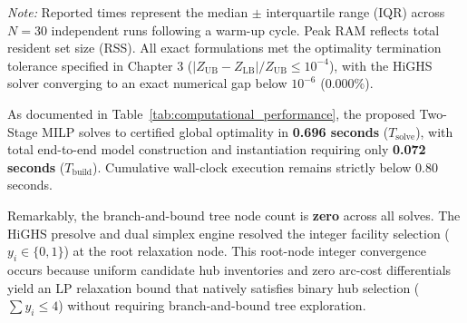 \begin{table}[htbp]
\centering
\caption{Computational Execution and Algorithmic Complexity Metrics across Formulations ($N = 30$ Runs)}
\label{tab:computational_performance}
\vspace{1ex}
\parbox{\textwidth}{\footnotesize \textit{Note:} Reported times represent the median $\pm$ interquartile range (IQR) across $N = 30$ independent runs following a warm-up cycle. Peak RAM reflects total resident set size (RSS). All exact formulations met the optimality termination tolerance specified in Chapter 3 ($|Z_{\text{UB}} - Z_{\text{LB}}| / Z_{\text{UB}} \le 10^{-4}$), with the HiGHS solver converging to an exact numerical gap below $10^{-6}$ ($0.000\%$).}
\end{table}

As documented in Table~\ref{tab:computational_performance}, the proposed Two-Stage MILP solves to certified global optimality in \textbf{0.696 seconds} ($T_{\text{solve}}$), with total end-to-end model construction and instantiation requiring only \textbf{0.072 seconds} ($T_{\text{build}}$). Cumulative wall-clock execution remains strictly below 0.80 seconds.

Remarkably, the branch-and-bound tree node count is \textbf{zero} across all solves. The HiGHS presolve and dual simplex engine resolved the integer facility selection ($y_i \in \{0, 1\}$) at the root relaxation node. This root-node integer convergence occurs because uniform candidate hub inventories and zero arc-cost differentials yield an LP relaxation bound that natively satisfies binary hub selection ($\sum y_i \le 4$) without requiring branch-and-bound tree exploration.

